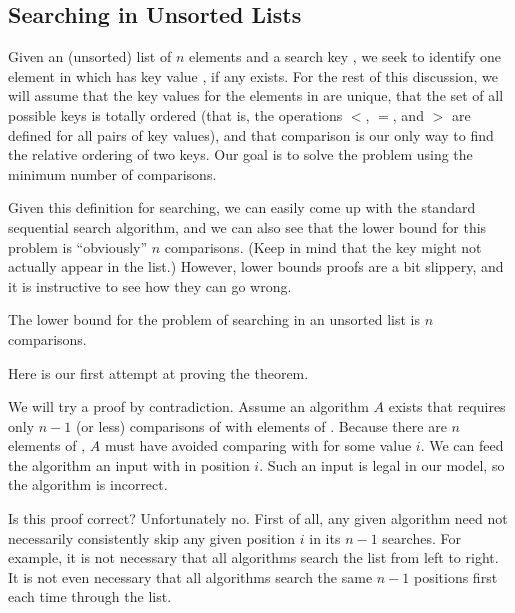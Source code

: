 \subsection{Searching in Unsorted Lists}
\label{BoundsUnordered}

Given an (unsorted) list  of \(n\) elements and 
a search key , we seek to identify one element in 
which has key value , if any exists. 
For the rest of this discussion, we will assume that the key values
for the elements in  are unique, that the set of all possible
keys is totally ordered (that is, the operations 
\(<\), \(=\), and \(>\) are defined for all pairs of key values),
and that comparison is our only way to find the relative ordering of
two keys.
Our goal is to solve the problem using the minimum number of
comparisons.

Given this definition for searching, we can easily come up with the
standard sequential search algorithm, and we can also see that the
lower bound for this problem is ``obviously'' \(n\) comparisons.
(Keep in mind that the key  might not actually appear in the
list.)
However, lower bounds proofs are a bit slippery, and it is instructive
to see how they can go wrong.

\begin{theorem}
The lower bound for the problem of searching in an unsorted list is
\(n\) comparisons. 
\end{theorem}

Here is our first attempt at proving the theorem.

\begin{numproof}{1}
We will try a proof by contradiction.
Assume an algorithm \(A\) exists that requires only \(n-1\) (or less)
comparisons of  with elements of .
Because there are \(n\) elements of , \(A\) must have avoided
comparing  with  for some value \(i\).
We can feed the algorithm an input with  in position \(i\).
Such an input is legal in our model, so the algorithm is incorrect.
\end{numproof}

Is this proof correct? Unfortunately no.
First of all, any given algorithm need not necessarily consistently 
skip any given position \(i\) in its \(n-1\) searches.
For example, it is not necessary that all algorithms search the list
from left to right.
It is not even necessary that all algorithms search the same \(n-1\)
positions first each time through the list.

